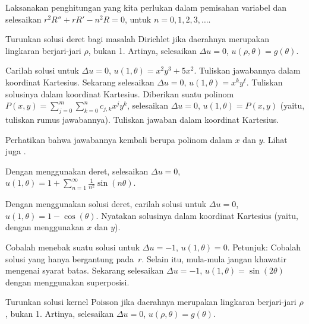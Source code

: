 \begin{exercise}
Laksanakan penghitungan yang kita perlukan dalam pemisahan variabel dan selesaikan
$r^2 R'' + r R' - n^2 R = 0$, untuk $n=0,1,2,3,\ldots$.
\end{exercise}

\begin{exercise}[menantang]
Turunkan solusi deret bagi masalah Dirichlet jika daerahnya merupakan
lingkaran berjari-jari $\rho$, bukan
1.
Artinya, selesaikan $\Delta u = 0$, $u(\rho,\theta) = g(\theta)$.
\end{exercise}

\begin{exercise}[menantang]
\leavevmode
\begin{tasks}
\task
Carilah solusi untuk
$\Delta u = 0$, $u(1,\theta) = x^2y^3 + 5 x^2$.  Tuliskan jawabannya dalam koordinat Kartesius.
\task
Sekarang selesaikan
$\Delta u = 0$, $u(1,\theta) = x^k y^\ell$.
Tuliskan solusinya dalam koordinat Kartesius.
\task
Diberikan suatu polinom $P(x,y) = \sum_{j=0}^m \sum_{k=0}^n c_{j,k}
x^j y^k$, selesaikan $\Delta u = 0$, $u(1,\theta) = P(x,y)$ (yaitu, tuliskan
rumus jawabannya).  Tuliskan jawaban
dalam koordinat Kartesius.
\end{tasks}
Perhatikan bahwa jawabannya kembali berupa polinom dalam $x$ dan $y$.
Lihat juga .
\end{exercise}

\setcounter{exercise}{100}

\begin{exercise}
Dengan menggunakan deret, selesaikan
$\Delta u = 0$, $u(1,\theta) = 1+ \sum\limits_{n=1}^\infty \frac{1}{n^2}\sin(n\theta)$.
\end{exercise}

\begin{exercise}
Dengan menggunakan solusi deret, carilah solusi untuk
$\Delta u = 0$, $u(1,\theta) = 1- \cos(\theta)$.  Nyatakan solusinya
dalam koordinat Kartesius (yaitu, dengan menggunakan $x$ dan $y$).
\end{exercise}

\begin{exercise}
\leavevmode
\begin{tasks}
\task
Cobalah menebak suatu solusi untuk $\Delta u = -1$, $u(1,\theta) = 0$.
Petunjuk: Cobalah solusi yang hanya bergantung pada~$r$.  Selain itu, mula-mula jangan khawatir
mengenai syarat batas.
\task
Sekarang selesaikan $\Delta u = -1$, $u(1,\theta) = \sin(2\theta)$ dengan menggunakan
superposisi.
\end{tasks}
\end{exercise}

\begin{exercise}[menantang]
Turunkan solusi kernel Poisson
jika daerahnya merupakan lingkaran berjari-jari $\rho$, bukan
1.  Artinya, selesaikan $\Delta u = 0$, $u(\rho,\theta) = g(\theta)$.
\end{exercise}
